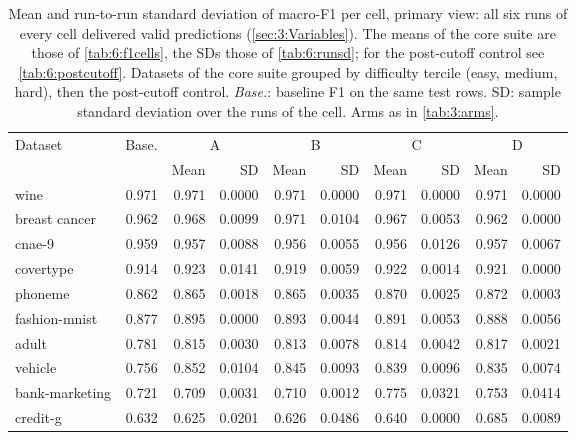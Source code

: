 \begin{table}[htbp]
  \centering
  \small
  \caption[Mean and SD of F1 per cell, primary view]{Mean and run-to-run standard deviation of macro-F1 per cell, primary view: all six runs of every cell delivered valid predictions (\autoref{sec:3:Variables}). The means of the core suite are those of \autoref{tab:6:f1cells}, the SDs those of \autoref{tab:6:runsd}; for the post-cutoff control see \autoref{tab:6:postcutoff}. Datasets of the core suite grouped by difficulty tercile (easy, medium, hard), then the post-cutoff control. \emph{Base.}: baseline F1 on the same test rows. SD: sample standard deviation over the runs of the cell. Arms as in \autoref{tab:3:arms}.}
  \label{tab:D:primary}
  \begin{tabular}{lrrrrrrrrr}
    \toprule
    Dataset & Base. & \multicolumn{2}{c}{A} & \multicolumn{2}{c}{B} & \multicolumn{2}{c}{C} & \multicolumn{2}{c}{D} \\
    \cmidrule(lr){3-4}\cmidrule(lr){5-6}\cmidrule(lr){7-8}\cmidrule(lr){9-10}
     & & Mean & SD & Mean & SD & Mean & SD & Mean & SD \\
    \midrule
    wine & 0.971 & 0.971 & 0.0000 & 0.971 & 0.0000 & 0.971 & 0.0000 & 0.971 & 0.0000 \\
    breast cancer & 0.962 & 0.968 & 0.0099 & 0.971 & 0.0104 & 0.967 & 0.0053 & 0.962 & 0.0000 \\
    cnae-9 & 0.959 & 0.957 & 0.0088 & 0.956 & 0.0055 & 0.956 & 0.0126 & 0.957 & 0.0067 \\
    covertype & 0.914 & 0.923 & 0.0141 & 0.919 & 0.0059 & 0.922 & 0.0014 & 0.921 & 0.0000 \\
    \addlinespace
    phoneme & 0.862 & 0.865 & 0.0018 & 0.865 & 0.0035 & 0.870 & 0.0025 & 0.872 & 0.0003 \\
    fashion-mnist & 0.877 & 0.895 & 0.0000 & 0.893 & 0.0044 & 0.891 & 0.0053 & 0.888 & 0.0056 \\
    adult & 0.781 & 0.815 & 0.0030 & 0.813 & 0.0078 & 0.814 & 0.0042 & 0.817 & 0.0021 \\
    vehicle & 0.756 & 0.852 & 0.0104 & 0.845 & 0.0093 & 0.839 & 0.0096 & 0.835 & 0.0074 \\
    \addlinespace
    bank-marketing & 0.721 & 0.709 & 0.0031 & 0.710 & 0.0012 & 0.775 & 0.0321 & 0.753 & 0.0414 \\
    credit-g & 0.632 & 0.625 & 0.0201 & 0.626 & 0.0486 & 0.640 & 0.0000 & 0.685 & 0.0089 \\

\end{tabular}
\end{table}
